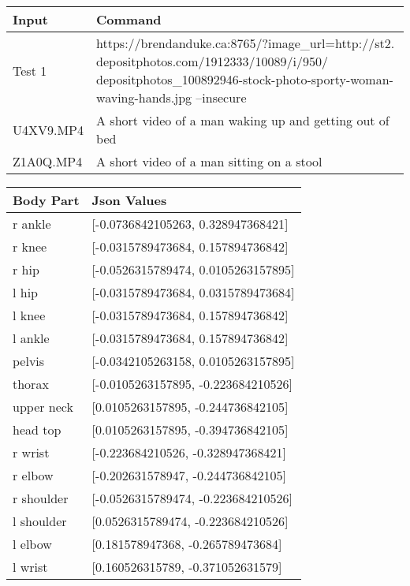 \documentclass{scrreprt}
\begin{document}
\begin{table}[H]
        \centering
        \begin{tabular}{p{3cm}p{6cm}}
                \hline\hline
                Input & Command\\
                \hline\hline
                Test 1 &  https://brendanduke.ca:8765/?image_url=http://st2.
                depositphotos.com/1912333/10089/i/950/
                depositphotos_100892946-stock-photo-sporty-woman-waving-hands.jpg --insecure\\
                \hline
                U4XV9.MP4  &  A short video of a man waking up and getting out of bed\\
                \hline
                Z1A0Q.MP4 & A short video of a man sitting on a stool\\
                \hline
        \end{tabular}
\end{table}

\begin{table}[H]
    \centering
    \begin{tabular}{||p{2cm}|p{6.5cm}||}
        \hline
        \textbf{Body Part} & \textbf {Json Values}\\
         \hline\hline
        r ankle & [-0.0736842105263, 0.328947368421] \\
        \hline
        r knee & [-0.0315789473684, 0.157894736842] \\
        \hline
        r hip & [-0.0526315789474, 0.0105263157895] \\
        \hline
        l hip & [-0.0315789473684, 0.0315789473684] \\
        \hline
        l knee & [-0.0315789473684, 0.157894736842] \\
        \hline
        l ankle & [-0.0315789473684, 0.157894736842] \\
        \hline
        pelvis & [-0.0342105263158, 0.0105263157895]\\
        \hline
        thorax & [-0.0105263157895, -0.223684210526] \\
        \hline
        upper neck & [0.0105263157895, -0.244736842105] \\
        \hline
        head top & [0.0105263157895, -0.394736842105] \\
        \hline
        r wrist & [-0.223684210526, -0.328947368421] \\
        \hline
        r elbow & [-0.202631578947, -0.244736842105] \\
        \hline
        r shoulder & [-0.0526315789474, -0.223684210526] \\
        \hline
        l shoulder & [0.0526315789474, -0.223684210526] \\
        \hline
        l elbow & [0.181578947368, -0.265789473684] \\
        \hline
        l wrist & [0.160526315789, -0.371052631579] \\
        \hline
    \end{tabular}
\end{table}
\end{document}
